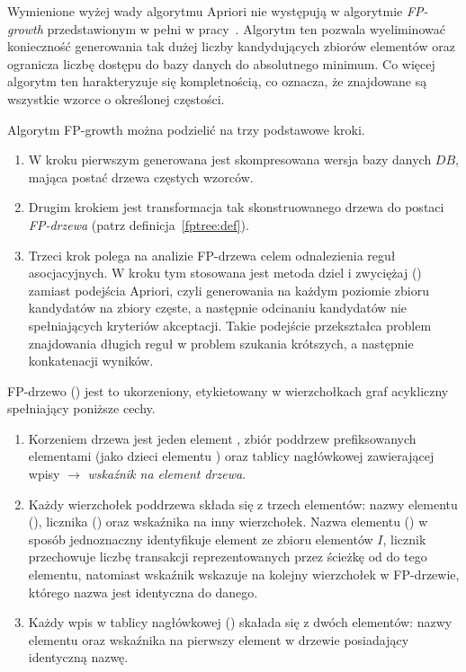 Wymienione wyżej wady algorytmu Apriori nie występują w algorytmie \emph{FP-growth} przedstawionym w pełni w pracy~\cite{Main:FPgrowth}. Algorytm ten pozwala wyeliminować konieczność generowania tak dużej liczby kandydujących zbiorów elementów oraz ogranicza liczbę dostępu do bazy danych do absolutnego minimum.  Co więcej algorytm ten harakteryzuje się kompletnością, co oznacza, że znajdowane są wszystkie wzorce o określonej częstości.

Algorytm FP-growth można podzielić na trzy podstawowe kroki.
\begin{enumerate}
	\item W kroku pierwszym generowana jest skompresowana wersja bazy danych $DB$, mająca postać drzewa częstych wzorców.
	\item Drugim krokiem jest transformacja tak skonstruowanego drzewa do postaci \emph{FP-drzewa} (patrz definicja~\ref{fptree:def}).
	\item Trzeci krok polega na analizie FP-drzewa celem odnalezienia reguł asocjacyjnych. W kroku tym stosowana jest metoda dziel i zwyciężaj () zamiast podejścia Apriori, czyli generowania na każdym poziomie zbioru kandydatów na zbiory częste, a następnie odcinaniu kandydatów nie spełniających kryteriów akceptacji. Takie podejście przekształca problem znajdowania długich reguł w problem szukania krótszych, a następnie konkatenacji wyników. 
\end{enumerate}

\begin{df}\label{fptree:def}
FP-drzewo () jest to ukorzeniony, etykietowany w wierzchołkach graf acykliczny spełniający poniższe cechy.
\end{df}
\begin{enumerate}
	\item Korzeniem drzewa jest jeden element , zbiór poddrzew prefiksowanych elementami (jako dzieci elementu ) oraz tablicy nagłówkowej zawierającej wpisy  $\rightarrow$ \emph{wskaźnik na element drzewa}.
	\item Każdy wierzchołek poddrzewa składa się z trzech elementów: nazwy elementu (), licznika () oraz wskaźnika na inny wierzchołek. Nazwa elementu () w sposób jednoznaczny identyfikuje element ze zbioru elementów $I$, licznik przechowuje liczbę transakcji reprezentowanych przez ścieżkę od  do tego elementu, natomiast wskaźnik wskazuje na kolejny wierzchołek w FP-drzewie, którego nazwa jest identyczna do danego.
	\item Każdy wpis w tablicy nagłówkowej () skałada się z dwóch elementów: nazwy elementu oraz wskaźnika na pierwszy element w drzewie posiadający identyczną nazwę.
\end{enumerate}

